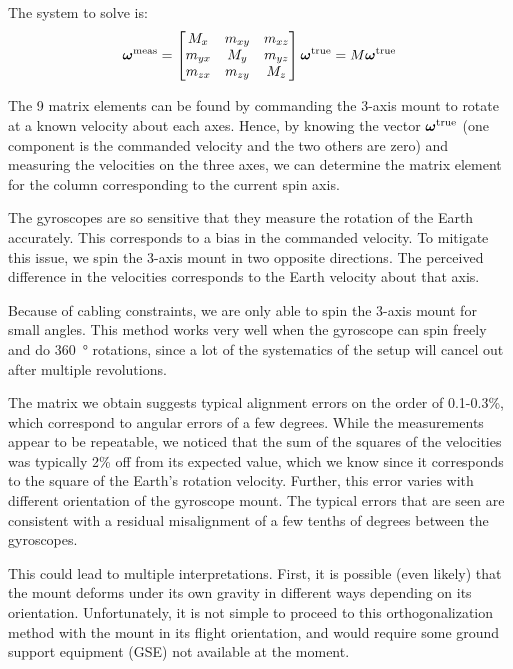 The system to solve is:
\begin{equation}
\boldsymbol\omega^\textrm{meas} = \begin{bmatrix} M_x & m_{xy} & m_{xz} \\   m_{yx} & M_y &m_{yz} \\  m_{zx} & m_{zy} & M_z \end{bmatrix} \boldsymbol\omega^\textrm{true} = M \boldsymbol\omega^\textrm{true} 
\end{equation}

The 9 matrix elements can be found by commanding the 3-axis mount to rotate at a known velocity about each axes. Hence, by knowing the vector $\boldsymbol\omega^\textrm{true}$ (one component is the commanded velocity and the two others are zero) and measuring the velocities on the three axes, we can determine the matrix element for the column corresponding to the current spin axis. 

The gyroscopes are so sensitive that they measure the rotation of the Earth accurately. This corresponds to a bias in the commanded velocity. To mitigate this issue, we spin the 3-axis mount in two opposite directions. The perceived difference in the velocities corresponds to the Earth velocity about that axis. 

Because of cabling constraints, we are only able to spin the 3-axis mount for small angles. This method works very well when the gyroscope can spin freely and do \SI{360}{\degree} rotations, since a lot of the systematics of the setup will cancel out after multiple revolutions. 

The matrix we obtain suggests typical alignment errors on the order of 0.1-0.3\%, which correspond to angular errors of a few degrees. While the measurements appear to be repeatable, we noticed that the sum of the squares of the velocities was typically 2\% off from its expected value, which we know since it corresponds to the square of the Earth's rotation velocity. Further, this error varies with different orientation of the gyroscope mount. The typical errors that are seen are consistent with a residual misalignment of a few tenths of degrees between the gyroscopes.

This could lead to multiple interpretations. First, it is possible (even likely) that the mount deforms under its own gravity in different ways depending on its orientation. Unfortunately, it is not simple to proceed to this orthogonalization method with the mount in its flight orientation, and would require some ground support equipment (GSE) not available at the moment. 

